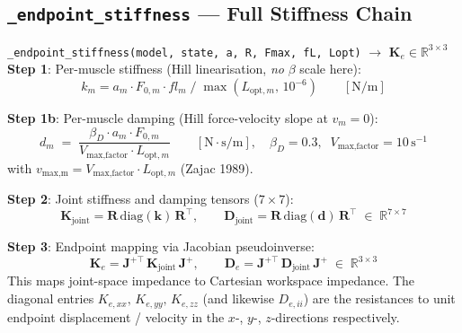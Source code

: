 \documentclass[11pt,a4paper]{article}
\newcommand{\R}{\mathbb{R}}
\newcommand{\bR}{\bm{R}}
\newcommand{\bK}{\bm{K}}
\newcommand{\bD}{\bm{D}}
\newcommand{\bJ}{\bm{J}}
\begin{document}
\subsection{\texttt{\_endpoint\_stiffness} — Full Stiffness Chain}

\begin{eqbox}{\texttt{\_endpoint\_stiffness(model, state, a, R, Fmax, fL, Lopt)}
  $\to$ $\bm{K}_e\in\R^{3\times3}$}
\textbf{Step 1}: Per-muscle stiffness (Hill linearisation, \emph{no} $\beta$ scale here):
\begin{equation}
k_m = a_m \cdot F_{0,m} \cdot fl_m \;/\; \max(L_{\text{opt},m},\,10^{-6})
\qquad [\text{N/m}]
\end{equation}

\textbf{Step 1b}: Per-muscle damping (Hill force-velocity slope at $v_m=0$):
\begin{equation}
\boxed{d_m \;=\; \frac{\beta_D \cdot a_m \cdot F_{0,m}}{V_\text{max,factor} \cdot L_{\text{opt},m}}}
\qquad [\text{N$\cdot$s/m}],
\quad \beta_D = 0.3,\;\; V_\text{max,factor} = 10\,\text{s}^{-1}
\end{equation}
with $v_\text{max,m}=V_\text{max,factor}\cdot L_{\text{opt},m}$ (Zajac 1989).

\textbf{Step 2}: Joint stiffness and damping tensors ($7\times7$):
\begin{equation}
\bK_\text{joint} = \bR\,\mathrm{diag}(\bm{k})\,\bR^\top,
\qquad
\bD_\text{joint} = \bR\,\mathrm{diag}(\bm{d})\,\bR^\top
\;\in\; \R^{7\times7}
\end{equation}

\textbf{Step 3}: Endpoint mapping via Jacobian pseudoinverse:
\begin{equation}
\boxed{\bm{K}_e = \bJ^{+\top}\,\bK_\text{joint}\,\bJ^+},
\qquad
\boxed{\bm{D}_e = \bJ^{+\top}\,\bD_\text{joint}\,\bJ^+}
\;\in\; \R^{3\times3}
\end{equation}
This maps joint-space impedance to Cartesian workspace impedance.
The diagonal entries $K_{e,xx},\,K_{e,yy},\,K_{e,zz}$ (and likewise
$D_{e,ii}$) are the resistances to unit endpoint displacement / velocity
in the $x$-, $y$-, $z$-directions respectively.
\end{eqbox}
\end{document}
